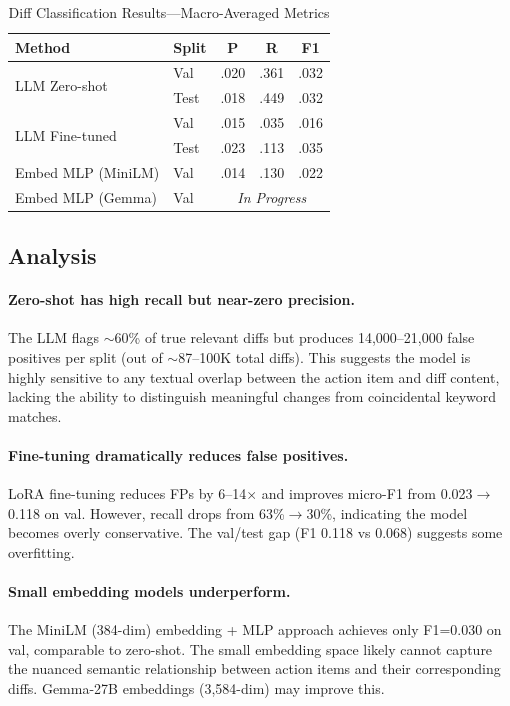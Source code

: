 \documentclass[11pt]{article}
\begin{document}
\begin{table}[h]
\centering
\caption{Diff Classification Results---Macro-Averaged Metrics}
\label{tab:diff_cls_macro}
\begin{tabular}{llccc}
\toprule
Method & Split & P & R & F1 \\
\midrule
\multirow{2}{*}{LLM Zero-shot}
 & Val  & .020 & .361 & .032 \\
 & Test & .018 & .449 & .032 \\
\midrule
\multirow{2}{*}{LLM Fine-tuned}
 & Val  & .015 & .035 & .016 \\
 & Test & .023 & .113 & .035 \\
\midrule
Embed MLP (MiniLM)
 & Val  & .014 & .130 & .022 \\
\midrule
\rowcolor{yellow!20}
Embed MLP (Gemma)
 & Val  & \multicolumn{3}{c}{\textit{In Progress}} \\
\bottomrule
\end{tabular}
\end{table}

\subsection{Analysis}

\paragraph{Zero-shot has high recall but near-zero precision.}
The LLM flags $\sim$60\% of true relevant diffs but produces 14{,}000--21{,}000 false positives per split (out of $\sim$87--100K total diffs). This suggests the model is highly sensitive to any textual overlap between the action item and diff content, lacking the ability to distinguish meaningful changes from coincidental keyword matches.

\paragraph{Fine-tuning dramatically reduces false positives.}
LoRA fine-tuning reduces FPs by 6--14$\times$ and improves micro-F1 from 0.023$\to$0.118 on val. However, recall drops from 63\%$\to$30\%, indicating the model becomes overly conservative. The val/test gap (F1 0.118 vs 0.068) suggests some overfitting.

\paragraph{Small embedding models underperform.}
The MiniLM (384-dim) embedding + MLP approach achieves only F1=0.030 on val, comparable to zero-shot. The small embedding space likely cannot capture the nuanced semantic relationship between action items and their corresponding diffs. Gemma-27B embeddings (3{,}584-dim) may improve this.
\end{document}
